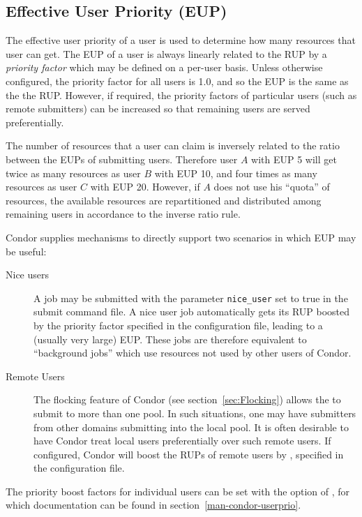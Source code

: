 \subsection{Effective User Priority (EUP)}
The effective user priority of a user is used to determine how many resources 
that user can get.  The EUP of a user is always linearly related to the RUP
by a \emph{priority factor} which may be defined on a per-user basis.  Unless 
otherwise configured, the priority factor for all users is 1.0, and so the EUP 
is the same as the the RUP.  However, if required, the priority factors of
particular users (such as remote submitters) can be increased so that 
remaining users are served preferentially.

The number of resources that a user can claim is inversely related to the ratio 
between the EUPs of submitting users.  Therefore user $A$ with EUP 5 will get 
twice as many resources as user $B$ with EUP 10, and four times as many 
resources as user $C$ with EUP 20.  However, if $A$ does not use his ``quota''
of resources, the available resources are repartitioned and distributed among
remaining users in accordance to the inverse ratio rule.

Condor supplies mechanisms to directly support two scenarios in which EUP may
be useful:
\begin{description}
	\item[Nice users]  A job may be submitted with the parameter 
	\texttt{nice\_user} set to true in the submit command file.  A nice user
	job automatically gets its RUP boosted by the 
	 priority factor specified in the 
	configuration file, leading to a (usually very large) EUP.  These jobs are 
	therefore equivalent to ``background jobs'' which use resources not used 
	by other users of Condor.

	\item[Remote Users]  The flocking feature of Condor (see 
	section~\ref{sec:Flocking}) allows the  to submit to more
	than one pool.  In such situations, one may have submitters from other
	domains submitting into the local pool.  It is often desirable to have
	Condor treat local users preferentially over such remote users.  If
	configured, Condor will boost the RUPs of remote users by 
	, specified in the configuration file.
\end{description}

The priority boost factors for individual users can be set with the 
 option of , for which documentation can
be found in section~\ref{man-condor-userprio}.

